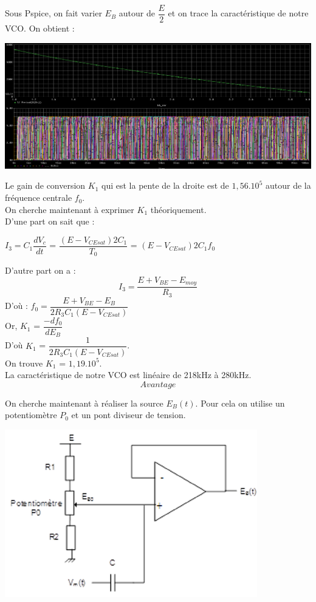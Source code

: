 \documentclass[a4paper]{report}
\begin{document}
Sous Pspice, on fait varier $E_B$ autour de $\dfrac{E}{2}$ et on trace la caractéristique de notre VCO. On obtient : \\
\begin{center}
\includegraphics[width=1\textwidth]{attaque_c_vco-eb.PNG}
\end{center}

Le gain de conversion $K_1$ qui est la pente de la droite est de $1,56.10^5$ autour de la fréquence centrale $f_0$.\\

On cherche maintenant à exprimer $K_1$ théoriquement.\\
D'une part on sait que :
\begin{center}
 $I_3 = C_1 \dfrac{dV_c}{dt}$ = $\dfrac{(E-
V_{CEsat})2C_1}{T_0}$ = $(E-V_{CEsat})2C_1f_0$
\end{center}

D'autre part on a : \\
$$I_3 = \dfrac{E+V_{BE}-E_{moy}}{R_3}$$
D'où : \hspace{4cm} $f_0 = \dfrac{E+V_{BE}-E_B}{2R_3C_1(E-V_{CEsat})} $\\
Or,\hspace{5cm} $K_1$ = $\dfrac{-df_0}{dE_B}$\\
D'où \hspace{4cm} $K_1$ = $\dfrac{1}{2R_3C_1(E-V_{CEsat})}$.\\ 
On trouve $K_1$ = $1,19.10^5$.\\
La caractéristique de notre VCO est linéaire de 218kHz à 280kHz.\\

$$Avantage$$

On cherche maintenant à réaliser la source $E_B(t)$. Pour cela on utilise un potentiomètre $P_0$ et un pont diviseur de tension.\\
\begin{center}
\includegraphics[width=.5\textwidth]{POT.PNG}
\end{center}
\end{document}
